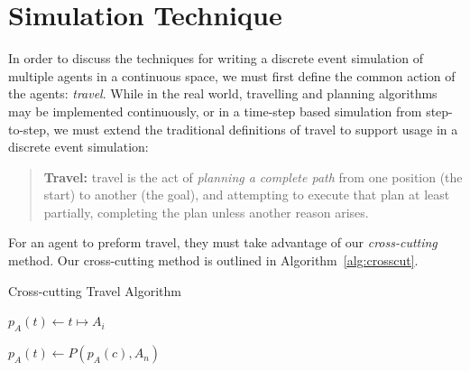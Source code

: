 \documentclass[conference,letterpaper]{IEEEtran}
\begin{document}
\section{Simulation Technique}
\label{sec:technique}

In order to discuss the techniques for writing a discrete event simulation of
multiple agents in a continuous space, we must first define the common action
of the agents: \emph{travel}. While in the real world, travelling and planning
algorithms may be implemented continuously, or in a time-step based simulation
from step-to-step, we must extend the traditional definitions of travel to
support usage in a discrete event simulation:

\begin{quote}
    \textbf{Travel:} travel is the act of \emph{planning a complete path} from
    one position (the start) to another (the goal), and attempting to execute
    that plan at least partially, completing the plan unless another reason
    arises.
\end{quote}

For an agent to preform travel, they must take advantage of our
\emph{cross-cutting} method. Our cross-cutting method is outlined in
Algorithm~\ref{alg:crosscut}.

\begin{algorithm}
    \caption{Cross-cutting Travel Algorithm}
    \label{alg:crosscut}

    \begin{algorithmic}
            \State {}
            \State $p_A(t) \gets t \mapsto A_i$
        \EndProcedure

            \State {}
            \State {}
            \State $p_A(t) \gets P(p_A(c), A_n)$
            \EndFor
        \EndProcedure
    \end{algorithmic}
\end{algorithm}
\end{document}
